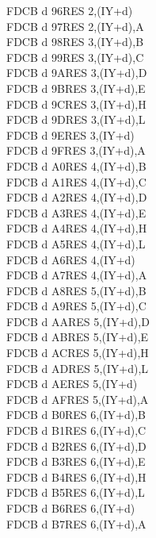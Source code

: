 \begin{multicols}{3}
{\begin{tabbing}
    FDCB d 96\>RES 2,(IY+d)\\
    FDCB d 97\>RES 2,(IY+d),A\UNDOC\\
    FDCB d 98\>RES 3,(IY+d),B\UNDOC\\
    FDCB d 99\>RES 3,(IY+d),C\UNDOC\\
    FDCB d 9A\>RES 3,(IY+d),D\UNDOC\\
    FDCB d 9B\>RES 3,(IY+d),E\UNDOC\\
    FDCB d 9C\>RES 3,(IY+d),H\UNDOC\\
    FDCB d 9D\>RES 3,(IY+d),L\UNDOC\\
    FDCB d 9E\>RES 3,(IY+d)\\
    FDCB d 9F\>RES 3,(IY+d),A\UNDOC\\
    FDCB d A0\>RES 4,(IY+d),B\UNDOC\\
    FDCB d A1\>RES 4,(IY+d),C\UNDOC\\
    FDCB d A2\>RES 4,(IY+d),D\UNDOC\\
    FDCB d A3\>RES 4,(IY+d),E\UNDOC\\
    FDCB d A4\>RES 4,(IY+d),H\UNDOC\\
    FDCB d A5\>RES 4,(IY+d),L\UNDOC\\
    FDCB d A6\>RES 4,(IY+d)\\
    FDCB d A7\>RES 4,(IY+d),A\UNDOC\\
    FDCB d A8\>RES 5,(IY+d),B\UNDOC\\
    FDCB d A9\>RES 5,(IY+d),C\UNDOC\\
    FDCB d AA\>RES 5,(IY+d),D\UNDOC\\
    FDCB d AB\>RES 5,(IY+d),E\UNDOC\\
    FDCB d AC\>RES 5,(IY+d),H\UNDOC\\
    FDCB d AD\>RES 5,(IY+d),L\UNDOC\\
    FDCB d AE\>RES 5,(IY+d)\\
    FDCB d AF\>RES 5,(IY+d),A\UNDOC\\
    FDCB d B0\>RES 6,(IY+d),B\UNDOC\\
    FDCB d B1\>RES 6,(IY+d),C\UNDOC\\
    FDCB d B2\>RES 6,(IY+d),D\UNDOC\\
    FDCB d B3\>RES 6,(IY+d),E\UNDOC\\
    FDCB d B4\>RES 6,(IY+d),H\UNDOC\\
    FDCB d B5\>RES 6,(IY+d),L\UNDOC\\
    FDCB d B6\>RES 6,(IY+d)\\
    FDCB d B7\>RES 6,(IY+d),A\UNDOC\\

\end{tabbing}}
\end{multicols}
